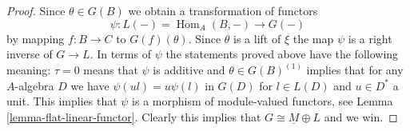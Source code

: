 \documentclass{stacks-project}
\theoremstyle{plain}
\theoremstyle{definition}
\theoremstyle{remark}
\numberwithin{equation}{subsection}
\def\Hom{\mathop{\mathrm{Hom}}\nolimits}
\begin{document}
\begin{proof}
\medskip\noindent
Since $\theta \in G(B)$ we obtain a transformation of functors
$$
\psi : L(-) = \Hom_A(B, - ) \longrightarrow G(-)
$$
by mapping $f : B \to C$ to $G(f)(\theta)$. Since $\theta$ is a lift of
$\xi$ the map $\psi$ is a right inverse of $G \to L$. In terms of
$\psi$ the statements proved above have the following meaning:
$\tau = 0$ means that $\psi$ is additive and
$\theta \in G(B)^{(1)}$ implies that for any $A$-algebra $D$ we have
$\psi(ul) = u\psi(l)$ in $G(D)$ for $l \in L(D)$ and $u \in D^*$ a unit.
This implies that $\psi$ is a morphism of module-valued functors, see
Lemma \ref{lemma-flat-linear-functor}.
Clearly this implies that $G \cong \underline{M} \oplus L$ and we win.
\end{proof}
\end{document}
